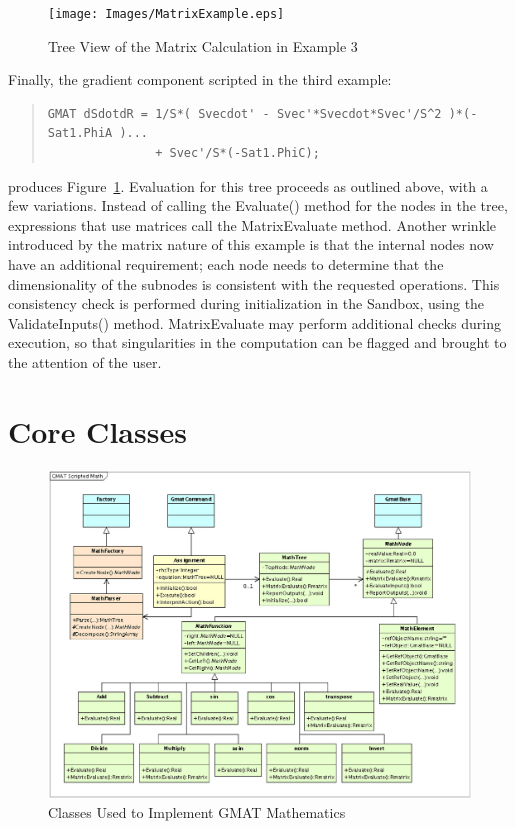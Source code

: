 \begin{figure}[tb]
\begin{center}
\texttt{[image: Images/MatrixExample.eps]}
\caption{\label{figure:matrixMathTree}Tree View of the Matrix Calculation in
Example 3}
\end{center}
\end{figure}

Finally, the gradient component scripted in the third example:

\begin{quote}\begin{verbatim}
GMAT dSdotdR = 1/S*( Svecdot' - Svec'*Svecdot*Svec'/S^2 )*(- Sat1.PhiA )...
               + Svec'/S*(-Sat1.PhiC);
\end{verbatim}\end{quote}

\noindent produces Figure~\ref{figure:matrixMathTree}.  Evaluation for this tree proceeds as
outlined above, with a few variations.  Instead of calling the Evaluate() method for the nodes in
the tree, expressions that use matrices call the MatrixEvaluate method.  Another wrinkle introduced
by the matrix nature of this example is that the internal nodes now have an additional requirement;
each node needs to determine that the dimensionality of the subnodes is consistent with the
requested operations.  This consistency check is performed during initialization in the Sandbox,
using the ValidateInputs() method.
MatrixEvaluate may perform additional checks during execution, so that
singularities in the computation can be flagged and brought to the attention of the user.

\section{Core Classes}

\begin{figure}
\begin{center}
\includegraphics[scale=0.5]{Images/MathClasses.eps}
\caption{\label{figure:MathClasses}Classes Used to Implement GMAT Mathematics}
\end{center}
\end{figure}

